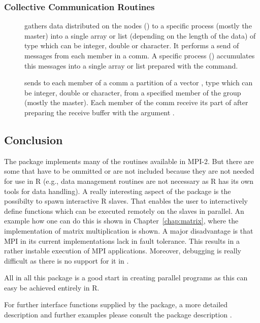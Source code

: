 \subsubsection{Collective Communication Routines}
\begin{description}
\item[] gathers
  data distributed on the nodes () to a 
  specific process (mostly the master) into a single array or list
  (depending on the length of the data) of type  which can
  be integer, double or character. It
  performs  
  a send of messages from each member in a comm. A
  specific process () accumulates this messages into a 
  single array or list prepared with the  command.
\item[]
  sends to each member of a comm a partition of  a vector ,
  type  which can be integer, double or character,
  from a specified member of the group (mostly the master). Each
  member of the comm receive its part of  after preparing the
  receive buffer with the argument .
\end{description}

\subsection{Conclusion}

The package  implements many of the routines available in
MPI-2. But there are some that have to be ommitted or are not included
because they are not needed for use in R (e.g., data management
routines are not necessary as R has its own tools for data handling).
A really interesting aspect of the  package is the
possibilty to spawn interactive R slaves. That enables the user to
interactively 
define functions which can be executed remotely on the slaves in
parallel. An example how one can do this is shown in
Chapter~\ref{chap:matrix}, where the implementation of matrix
multiplication is shown. A major disadvantage is that MPI in its
current implementations lack in fault tolerance. This results in a
rather instable execution of MPI applications. Moreover, debugging
is really difficult as there is no support for it in .

All in all this package is a good start in creating parallel programs
as this can easy be achieved entirely in R.

For further interface functions supplied by the  package, a
more detailed description and further examples please consult the
package description \cite{yu06Rmpi}.
